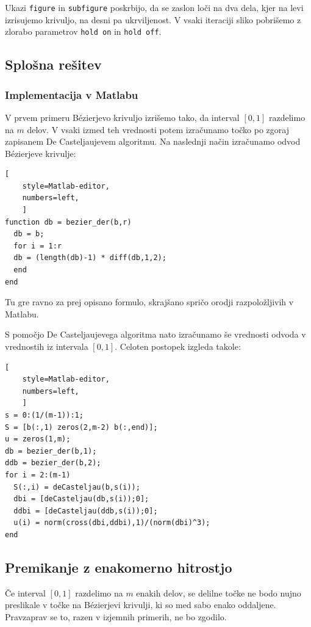 \documentclass[a4paper,12pt]{article}
\begin{document}
	Ukazi \lstinline[style=Matlab-editor]!figure! in \lstinline[style=Matlab-editor]!subfigure! poskrbijo, da se zaslon loči na dva dela, kjer na levi izrisujemo krivuljo, na desni pa ukrviljenost. V vsaki iteraciji sliko pobrišemo z zlorabo parametrov \lstinline[style=Matlab-editor]!hold on! in \lstinline[style=Matlab-editor]!hold off!.
	
	\subsection{Splošna rešitev}
	
	\subsubsection{Implementacija v Matlabu}
	
	V prvem primeru B\'ezierjevo krivuljo izrišemo tako, da interval $[0,1]$ razdelimo na $m$ delov. V vsaki izmed teh vrednosti potem izračunamo točko po zgoraj zapisanem De Casteljaujevem algoritmu. Na naslednji način izračunamo odvod B\'ezierjeve krivulje:
	
	\begin{lstlisting}[
	style=Matlab-editor,
	numbers=left,
	]
function db = bezier_der(b,r)
  db = b;
  for i = 1:r
  db = (length(db)-1) * diff(db,1,2);
  end
end
	\end{lstlisting}
	
	Tu gre ravno za prej opisano formulo, skrajšano spričo orodji razpoložljivih v Matlabu. 
	
	S pomočjo De Casteljaujevega algoritma nato izračunamo še vrednosti odvoda v vrednostih iz intervala $[0,1]$. Celoten postopek izgleda takole:
	
	\begin{lstlisting}[
	style=Matlab-editor,
	numbers=left,
	]
s = 0:(1/(m-1)):1;
S = [b(:,1) zeros(2,m-2) b(:,end)];
u = zeros(1,m);
db = bezier_der(b,1);
ddb = bezier_der(b,2);
for i = 2:(m-1)
  S(:,i) = deCasteljau(b,s(i));
  dbi = [deCasteljau(db,s(i));0];
  ddbi = [deCasteljau(ddb,s(i));0];
  u(i) = norm(cross(dbi,ddbi),1)/(norm(dbi)^3);
end
	\end{lstlisting}
	
	\subsection{Premikanje z enakomerno hitrostjo}
	
	Če interval $[0,1]$ razdelimo na $m$ enakih delov, se delilne točke ne bodo nujno preslikale v točke na B\'ezierjevi krivulji, ki so med sabo enako oddaljene. Pravzaprav se to, razen v izjemnih primerih, ne bo zgodilo. 
	
\end{document}
